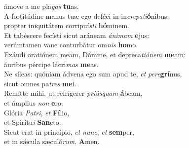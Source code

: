 \oddverse ámove a me pla\textit{gas} \textbf{tu}as.\\
\evenverse A fortitúdine manus tuæ ego deféci in in\textit{cre}\textit{pa}\textit{ti}\textbf{ó}nibus:~\*\\
\evenverse propter iniquitátem corripuí\textit{sti} \textbf{hó}minem.\\
\oddverse Et tabéscere fecísti sicut aráneam \textit{á}\textit{ni}\textit{mam} \textbf{e}jus:~\*\\
\oddverse verúmtamen vane conturbátur om\textit{nis} \textbf{ho}mo.\\
\evenverse Exáudi oratiónem meam, Dómine, et depreca\textit{ti}\textit{ó}\textit{nem} \textbf{me}am:~\*\\
\evenverse áuribus pércipe lácri\textit{mas} \textbf{me}as.\\
\oddverse Ne síleas: quóniam ádvena ego sum apud te, \textit{et} \textit{pe}\textit{re}\textbf{grí}nus,~\*\\
\oddverse sicut omnes pa\textit{tres} \textbf{me}i.\\
\evenverse Remítte mihi, ut refrígerer \textit{pri}\textit{ús}\textit{quam} \textbf{á}beam,~\*\\
\evenverse et ámplius \textit{non} \textbf{e}ro.\\
\oddverse Glória \textit{Pa}\textit{tri}, \textit{et} \textbf{Fí}lio,~\*\\
\oddverse et Spirítu\textit{i} \textbf{San}cto.\\
\evenverse Sicut erat in princípio, \textit{et} \textit{nunc}, \textit{et} \textbf{sem}per,~\*\\
\evenverse et in sǽcula sæculó\textit{rum}. \textbf{A}men.\\
